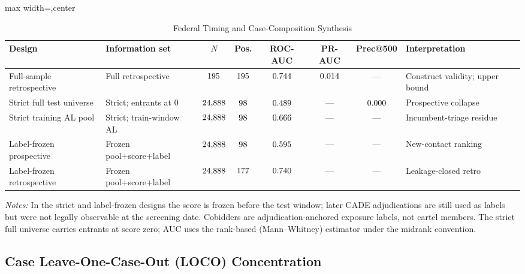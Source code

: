 \begin{table}[htbp]
\centering
\caption{Federal Timing and Case-Composition Synthesis}
\label{supp:tab_federal_timing}
\scriptsize
\begin{adjustbox}{max width=\textwidth,center}
\begin{threeparttable}
\begin{tabular}{p{2.9cm}p{2.6cm}cccccp{3.0cm}}
\toprule
Design & Information set & $N$ & Pos. & ROC-AUC & PR-AUC & Prec@500 & Interpretation \\
\midrule
Full-sample retrospective & Full retrospective & $195$ & $195$ & $0.744$ & $0.014$ & --- & Construct validity; upper bound \\
Strict full test universe & Strict; entrants at 0 & $24{,}888$ & $98$ & $0.489$ & --- & $0.000$ & Prospective collapse \\
Strict training AL pool & Strict; train-window AL & $24{,}888$ & $98$ & $0.666$ & --- & --- & Incumbent-triage residue \\
Label-frozen prospective & Frozen pool+score+label & $24{,}888$ & $98$ & $0.595$ & --- & --- & New-contact ranking \\
Label-frozen retrospective & Frozen pool+score+label & $24{,}888$ & $177$ & $0.740$ & --- & --- & Leakage-closed retro \\
\bottomrule
\end{tabular}
\begin{tablenotes}
\scriptsize
\item \textit{Notes:} In the strict and label-frozen designs the score is
frozen before the test window; later CADE adjudications are still used as
labels but were not legally observable at the screening date. Cobidders are
adjudication-anchored exposure labels, not cartel members. The strict full
universe carries entrants at score zero; AUC uses the rank-based
(Mann--Whitney) estimator under the midrank convention.
\end{tablenotes}
\end{threeparttable}
\end{adjustbox}
\end{table}

\subsection{Case Leave-One-Case-Out (LOCO) Concentration}
\label{supp:federal_loco}

